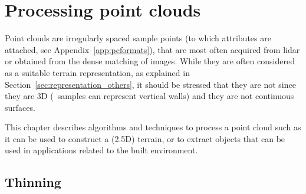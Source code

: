 
\setchapterpreamble[u]{\margintoc}

\graphicspath{{pcprocessing/figs/}}

\chapter{Processing point clouds}%
\label{chap:pcprocessing}

Point clouds are irregularly spaced sample points (to which attributes are attached, see Appendix~\ref{app:pcformats}), that are most often acquired from lidar or obtained from the dense matching of images.
While they are often considered as a suitable terrain representation, as explained in Section~\ref{sec:representation_others}, it should be stressed that they are not since they are 3D (\eg\ samples can represent vertical walls) and they are not continuous surfaces.

This chapter describes algorithms and techniques to process a point cloud such as it can be used to construct a (2.5D) terrain, or to extract objects that can be used in applications related to the built environment.



%
\section{Thinning}%
\label{sec:thinning}%

